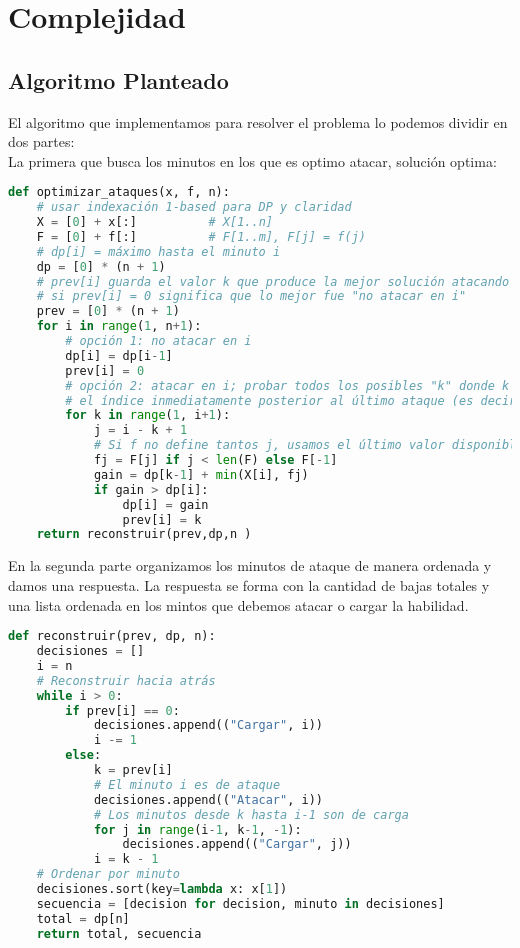 \section{Complejidad}

\subsection{Algoritmo Planteado}

El algoritmo que implementamos para resolver el problema lo podemos dividir en dos partes:\\
La primera que busca los minutos en los que es optimo atacar, solución optima:
\begin{lstlisting}[language=Python]
def optimizar_ataques(x, f, n):
    # usar indexación 1-based para DP y claridad
    X = [0] + x[:]          # X[1..n]
    F = [0] + f[:]          # F[1..m], F[j] = f(j)
    # dp[i] = máximo hasta el minuto i
    dp = [0] * (n + 1)
    # prev[i] guarda el valor k que produce la mejor solución atacando en i
    # si prev[i] = 0 significa que lo mejor fue "no atacar en i" 
    prev = [0] * (n + 1)
    for i in range(1, n+1):
        # opción 1: no atacar en i
        dp[i] = dp[i-1]
        prev[i] = 0
        # opción 2: atacar en i; probar todos los posibles "k" donde k indica
        # el índice inmediatamente posterior al último ataque (es decir, acumulamos desde k hasta i inclusive: j = i-k+1 minutos de carga)
        for k in range(1, i+1):
            j = i - k + 1
            # Si f no define tantos j, usamos el último valor disponible (creciente)
            fj = F[j] if j < len(F) else F[-1]
            gain = dp[k-1] + min(X[i], fj)
            if gain > dp[i]:
                dp[i] = gain
                prev[i] = k
    return reconstruir(prev,dp,n )
\end{lstlisting}
En la segunda parte organizamos los minutos de ataque de manera ordenada y damos una respuesta. La respuesta se forma con la cantidad de bajas totales y una lista ordenada en los mintos que debemos atacar o cargar la habilidad.
\begin{lstlisting}[language=Python]
def reconstruir(prev, dp, n):
    decisiones = []
    i = n
    # Reconstruir hacia atrás
    while i > 0:
        if prev[i] == 0:
            decisiones.append(("Cargar", i))
            i -= 1
        else:
            k = prev[i]
            # El minuto i es de ataque
            decisiones.append(("Atacar", i))
            # Los minutos desde k hasta i-1 son de carga
            for j in range(i-1, k-1, -1):
                decisiones.append(("Cargar", j))
            i = k - 1
    # Ordenar por minuto
    decisiones.sort(key=lambda x: x[1])
    secuencia = [decision for decision, minuto in decisiones]
    total = dp[n]
    return total, secuencia
    
\end{lstlisting}
\pagebreak 
